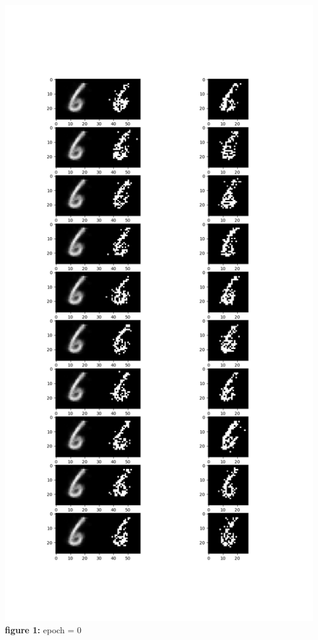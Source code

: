 \documentclass{article}
\theoremstyle{definition}
\theoremstyle{remark}
\begin{document}
\begin{enumerate}[font={\Large\bfseries}]
\begin{center}
			\includegraphics[scale=0.5]{data_space.png}\\
			\textbf{figure 1:} epoch = 0\\


		\end{center}



\end{enumerate}
\end{document}
